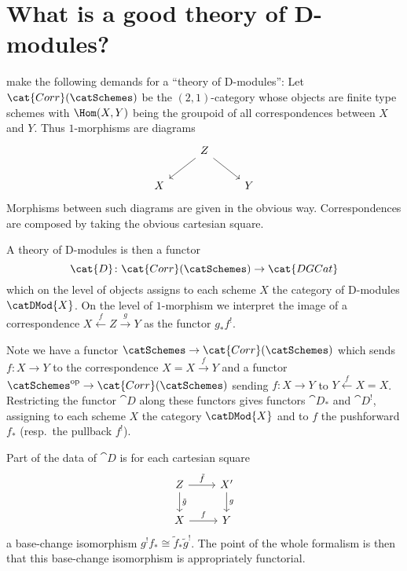 \documentclass{ck-article}
\newcommand\catDGCat{\cat{DGCat}}
\newcommand\catCorrSch{\cat{Corr}(\catSchemes)}
\begin{document}
\section{What is a good theory of D-modules?}

\cite{FrancisGaitsgory:2012:ChiralKoszulDuality} make the following demands for a \enquote{theory of D-modules}:
Let $\catCorrSch$ be the $(2,1)$-category whose objects are finite type schemes with $\Hom(X,Y)$ being the groupoid of all correspondences between $X$ and $Y$.
Thus $1$-morphisms are diagrams
\[
    \begin{tikzcd}
        & Z \arrow[dl] \arrow[dr] & \\
        X & & Y
    \end{tikzcd}
\]
Morphisms between such diagrams are given in the obvious way.
Correspondences are composed by taking the obvious cartesian square.

A theory of D-modules is then a functor
\[
    \cat{D}\colon \catCorrSch \to \catDGCat
\]
which on the level of objects assigns to each scheme $X$ the category of D-modules $\catDMod{X}$.
On the level of $1$-morphism we interpret the image of a correspondence $X \xleftarrow{f} Z \xrightarrow{g} Y$ as the functor $g_* f^!$.

Note we have a functor $\catSchemes \to \catCorrSch$ which sends $f\colon X \to Y$ to the correspondence $X = X \xrightarrow{f} Y$ and a functor $\catSchemes^{\mathrm{op}} \to \catCorrSch$ sending $f\colon X \to Y$ to $Y \xleftarrow{f} X = X$.
Restricting the functor $\cat{D}$ along these functors gives functors $\cat{D}_*$ and $\cat{D}^!$, assigning to each scheme $X$ the category $\catDMod{X}$ and to $f$ the pushforward $f_*$ (resp.~the pullback $f^!$).

Part of the data of $\cat{D}$ is for each cartesian square
\[
    \begin{tikzcd}
        Z \arrow[r, "\tilde f"] \arrow[d, "\tilde g"] & X' \arrow[d, "g"] \\
        X \arrow[r, "f"] & Y
    \end{tikzcd}
\]
a base-change isomorphism $g^!f_* \cong \tilde f_*\tilde g^!$.
The point of the whole formalism is then that this base-change isomorphism is appropriately functorial.
\end{document}
